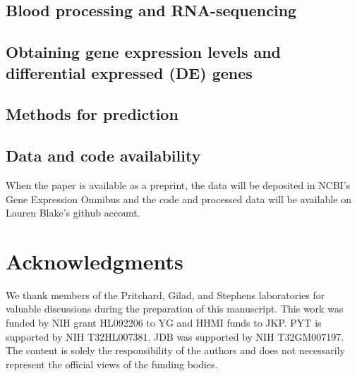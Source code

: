 \subsection{Blood processing and RNA-sequencing}\label{single-cell-capture-and-library-preparation}


\subsection{Obtaining gene expression levels and differential expressed (DE) genes}\label{illumina-high-throughput-sequencing}


\subsection{Methods for prediction}\label{read-mapping}



\subsection{Data and code
availability}\label{ch04-data-and-code-availability}

When the paper is available as a preprint, the data will be deposited in NCBI's Gene Expression Omnibus and the code and processed data will be available on Lauren Blake's github account. 

\section{Acknowledgments}\label{ch04-acknowledgments}

We thank members of the Pritchard, Gilad, and Stephens laboratories
for valuable discussions during the preparation of this
manuscript. This work was funded by NIH grant HL092206 to YG and HHMI
funds to JKP. PYT is supported by NIH T32HL007381. JDB was supported
by NIH T32GM007197.  The content is solely the responsibility of the
authors and does not necessarily represent the official views of the
funding bodies. 

